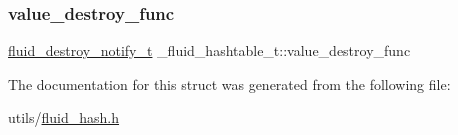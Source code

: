\mbox{\label{struct__fluid__hashtable__t_a96b147edad0233ebd40884f46297ea87}} 
\subsubsection{\texorpdfstring{value\+\_\+destroy\+\_\+func}{value\_destroy\_func}}
{\footnotesize\ttfamily \hyperlink{fluid__hash_8h_a5fe009909539e295b7af5978fed06126}{fluid\+\_\+destroy\+\_\+notify\+\_\+t} \+\_\+fluid\+\_\+hashtable\+\_\+t\+::value\+\_\+destroy\+\_\+func}



The documentation for this struct was generated from the following file\+:\begin{DoxyCompactItemize}
\item 
utils/\hyperlink{fluid__hash_8h}{fluid\+\_\+hash.\+h}\end{DoxyCompactItemize}
